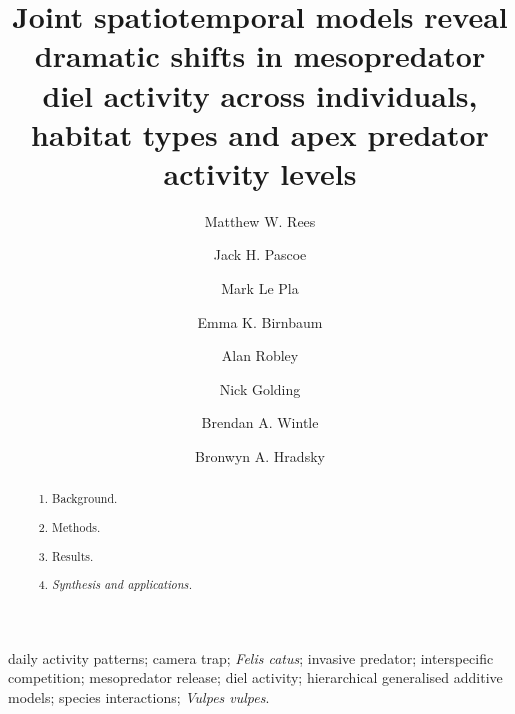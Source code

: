 \documentclass[]{elsarticle} %
\providecommand{\tightlist}{%
  \setlength{\itemsep}{0pt}\setlength{\parskip}{0pt}}
\begin{document}
\begin{frontmatter}

  \title{Joint spatiotemporal models reveal dramatic shifts in mesopredator diel activity across individuals, habitat types and apex predator activity levels}
    \author[UOM]{Matthew W. Rees}
    \author[CEC]{Jack H. Pascoe}
  
    \author[CEC]{Mark Le Pla}
  
    \author[CEC]{Emma K. Birnbaum}
  
    \author[ARI]{Alan Robley}
  
    \author[CU,TKI]{Nick Golding}
  
    \author[UOM]{Brendan A. Wintle}
  
    \author[UOM]{Bronwyn A. Hradsky}
  
      \address[UOM]{Quantitative \& Applied Ecology Group, School of Ecosystem and Forest Science, The University of Melbourne, Parkville, VIC, Australia}
    \address[CEC]{Conservation Ecology Centre, Otway Lighthouse Rd, Cape Otway, VIC, Australia}
    \address[ARI]{Department of Environment, Land, Water and Planning, Arthur Rylah Institute for Environmental Research, Heidelberg, Australia}
    \address[CU]{Curtin University, Bentley, WA, Australia}
    \address[TKI]{Telethon Kids Institute, Perth Children's Hospital, Nedlands, WA, Australia}
  
  \begin{abstract}
  \begin{enumerate}
  \def\labelenumi{\arabic{enumi}.}
  \tightlist
  \item
    Background.
  \item
    Methods.
  \item
    Results.
  \item
    \emph{Synthesis and applications.}
  \end{enumerate}
  \end{abstract}
   \begin{keyword} daily activity patterns; camera trap; \emph{Felis catus}; invasive predator; interspecific competition; mesopredator release; diel activity; hierarchical generalised additive models; species interactions; \emph{Vulpes vulpes}.\end{keyword}
 \end{frontmatter}

\parskip=12pt

\newpage
\end{document}

